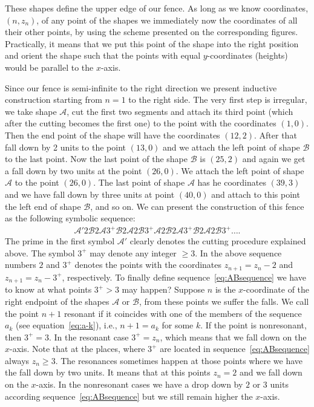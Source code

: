 \documentclass[pdftex]{sigma}
\numberwithin{equation}{section}
\begin{document}
These shapes define the upper edge of our fence. As long as we know coordinates, $(n,z_n)$, of any point of the shapes
we immediately now the coordinates of all their other points, by using the scheme presented on the corresponding figures.
Practically, it means that we put this point of the shape into the right position and orient the shape such that the points
with equal $y$-coordinates (heights) would be parallel to the $x$-axis.

Since our fence is semi-infinite to the right direction we present inductive construction starting from $n=1$ to the right side.
The very first step is irregular, we take shape $\mathcal{A}$, cut the first two segments and attach its third point (which
after the cutting becomes the first one) to the point with the coordinates $(1,0)$. Then the end point of the shape will have
the coordinates $(12,2)$. After that fall down by 2 units to the point $(13,0)$ and we attach the left point of shape $\mathcal{B}$
to the last point. Now the last point of the shape $\mathcal{B}$ is $(25,2)$ and again we get a fall down by two units at the
point $(26,0)$. We attach the left point of shape $\mathcal{A}$ to the point $(26,0)$. The last point of shape $\mathcal{A}$
has he coordinates $(39,3)$ and we have fall down by three units at point $(40,0)$ and attach to this point the left end of
shape $\mathcal{B}$, and so on. We can present the construction of this fence as the following symbolic sequence:
\begin{gather}\label{eq:ABsequence}
\mathcal{A}' 2 \mathcal{B} 2 \mathcal{A} 3^+\mathcal{B} 2 \mathcal{A} 2 \mathcal{B} 3^+
\mathcal{A} 2 \mathcal{B} 2 \mathcal{A}3^+\mathcal{B} 2 \mathcal{A} 2 \mathcal{B} 3^+\ldots.
\end{gather}
The prime in the first symbol $\mathcal{A}'$ clearly denotes the cutting procedure explained above. The symbol $3^+$
may denote any integer $\geq3$. In the above sequence numbers $2$ and $3^+$ denotes the points with the coordinates
$z_{n+1}=z_n-2$ and $z_{n+1}=z_n-3^+$, respectively. To finally define sequence~\eqref{eq:ABsequence} we have to know at what
points $3^+>3$ may happen? Suppose $n$ is the $x$-coordinate of the right endpoint of the shapes $\mathcal{A}$ or
$\mathcal{B}$, from these points we suffer the falls.
We call the point $n+1$ resonant if it coincides with one of the members of the sequence $a_k$ (see equation~\eqref{eq:a-k}),
i.e., $n+1=a_k$ for some $k$. If the point is nonresonant, then $3^+=3$. In the resonant case $3^+=z_n$, which means
that we fall down on the $x$-axis. Note that at the places, where $3^+$ are located in sequence~\eqref{eq:ABsequence}
always $z_n\geq3$. The resonances sometimes happen at those points where we have the fall down by two units.
It means that at this points $z_n=2$ and we fall down on the $x$-axis. In the nonresonant cases we have a drop down by $2$ or $3$ units according
sequence~\eqref{eq:ABsequence} but we still remain higher the $x$-axis.
\end{document}
